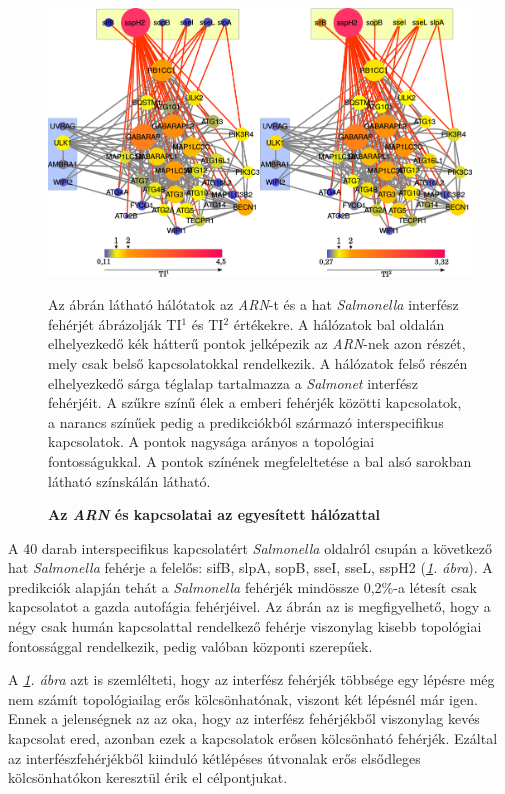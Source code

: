\documentclass[a4paper,12pt]{article}
\newenvironment{imgdesc}{
		\small
		\singlespacing
		\begin{center}
		
	}{
		\end{center}	
	}
\begin{document}
				\begin{figure}[H]
					\includegraphics[scale=0.4]{img/connection_prots_v2_complete.pdf}
					\centering
					\caption{ \textbf{Az \textit{ARN} és kapcsolatai az egyesített hálózattal}}		
					\label{fig:connection}
					\begin{imgdesc}
					Az ábrán látható hálótatok az \textit{ARN}-t és a hat \textit{Salmonella} interfész fehérjét ábrázolják TI$^1$ és TI$^2$ értékekre. A hálózatok bal oldalán elhelyezkedő kék hátterű pontok jelképezik az \textit{ARN}-nek azon részét, mely csak belső kapcsolatokkal rendelkezik. A hálózatok felső részén elhelyezkedő sárga téglalap tartalmazza a \textit{Salmonet} interfész fehérjéit. A szűkre színű élek a emberi fehérjék közötti kapcsolatok, a narancs színűek pedig a predikciókból származó interspecifikus kapcsolatok. A pontok nagysága arányos a topológiai fontosságukkal. A pontok színének megfeleltetése a bal alsó sarokban látható színskálán látható. 
					\end{imgdesc}			 		 
				\end{figure}

				
		 A 40 darab interspecifikus kapcsolatért \textit{Salmonella} oldalról csupán a következő hat \textit{Salmonella} fehérje a felelős: sifB, slpA, sopB, sseI, sseL, sspH2 (\textit{\ref{fig:connection}. ábra}). A predikciók alapján tehát a \textit{Salmonella} fehérjék mindössze 0,2\%-a létesít csak kapcsolatot a gazda autofágia fehérjéivel. Az ábrán az is megfigyelhető, hogy a négy csak humán kapcsolattal rendelkező fehérje viszonylag kisebb topológiai fontossággal rendelkezik, pedig valóban központi szerepűek.
		 
		 A \textit{\ref{fig:connection}. ábra} azt is szemlélteti, hogy az interfész fehérjék többsége egy lépésre még nem számít topológiailag erős kölcsönhatónak, viszont két lépésnél már igen. Ennek a jelenségnek az az oka, hogy az interfész fehérjékből viszonylag kevés kapcsolat ered, azonban ezek a kapcsolatok erősen kölcsönható fehérjék. Ezáltal az interfészfehérjékből kiinduló kétlépéses útvonalak erős elsődleges kölcsönhatókon keresztül érik el célpontjukat.
		
\end{document}
